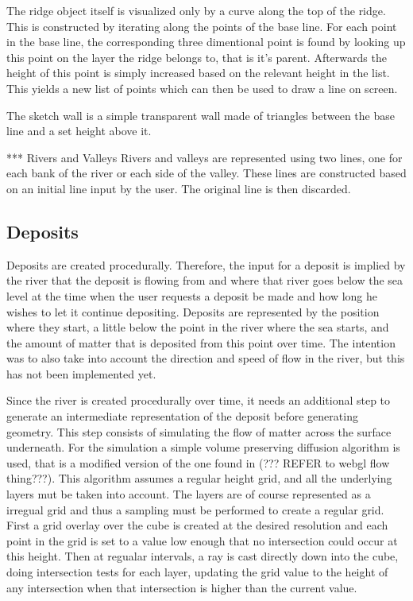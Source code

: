 \documentclass[a4paper,12pt]{report}
\begin{document}
The ridge object itself is visualized only by a curve along the top of the ridge. This is constructed by iterating along the points of the base line. For each point in the base line, the corresponding three dimentional point is found by looking up this point on the layer the ridge belongs to, that is it's parent. Afterwards the height of this point is simply increased based on the relevant height in the list. This yields a new list of points which can then be used to draw a line on screen.

The sketch wall is a simple transparent wall made of triangles between the base line and a set height above it.

*** Rivers and Valleys
Rivers and valleys are represented using two lines, one for each bank of the river or each side of the valley. These lines are constructed based on an initial line input by the user. The original line is then discarded. 


\subsection{Deposits}
Deposits are created procedurally. Therefore, the input for a deposit is implied by the river that the deposit is flowing from and where that river goes below the sea level at the time when the user requests a deposit be made and how long he wishes to let it continue depositing. Deposits are represented by the position where they start, a little below the point in the river where the sea starts, and the amount of matter that is deposited from this point over time. The intention was to also take into account the direction and speed of flow in the river, but this has not been implemented yet.

Since the river is created procedurally over time, it needs an additional step to generate an intermediate representation of the deposit before generating geometry. This step consists of simulating the flow of matter across the surface underneath. For the simulation a simple volume preserving diffusion algorithm is used, that is a modified version of the one found in (??? REFER to webgl flow thing???). This algorithm assumes a regular height grid, and all the underlying layers mut be taken into account. The layers are of course represented as a irregual grid and thus a sampling must be performed to create a regular grid. First a grid overlay over the cube is created at the desired resolution and each point in the grid is set to a value low enough that no intersection could occur at this height. Then at regualar intervals, a ray is cast directly down into the cube, doing intersection tests for each layer, updating the grid value to the height of any intersection when that intersection is higher than the 
current value.
\end{document}
